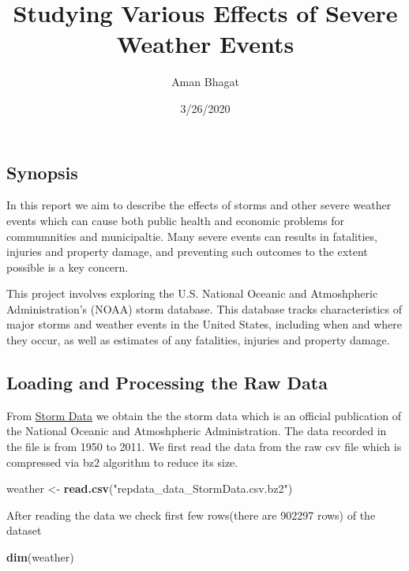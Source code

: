 \documentclass[
]{article}
\title{Studying Various Effects of Severe Weather Events}
\author{Aman Bhagat}
\date{3/26/2020}
\newenvironment{Shaded}{\begin{snugshade}}{\end{snugshade}}
\newcommand{\KeywordTok}[1]{\textcolor[rgb]{0.13,0.29,0.53}{\textbf{#1}}}
\newcommand{\NormalTok}[1]{#1}
\newcommand{\StringTok}[1]{\textcolor[rgb]{0.31,0.60,0.02}{#1}}
\begin{document}
\maketitle

\hypertarget{synopsis}{%
\subsection{Synopsis}\label{synopsis}}

In this report we aim to describe the effects of storms and other severe
weather events which can cause both public health and economic problems
for commumnities and municipaltie. Many severe events can results in
fatalities, injuries and property damage, and preventing such outcomes
to the extent possible is a key concern.

This project involves exploring the U.S. National Oceanic and
Atmoshpheric Administration's (NOAA) storm database. This database
tracks characteristics of major storms and weather events in the United
States, including when and where they occur, as well as estimates of any
fatalities, injuries and property damage.

\hypertarget{loading-and-processing-the-raw-data}{%
\subsection{Loading and Processing the Raw
Data}\label{loading-and-processing-the-raw-data}}

From
\href{https://d396qusza40orc.cloudfront.net/repdata\%2Fdata\%2FStormData.csv.bz2}{Storm
Data} we obtain the the storm data which is an official publication of
the National Oceanic and Atmoshpheric Administration. The data recorded
in the file is from 1950 to 2011. We first read the data from the raw
csv file which is compressed via bz2 algorithm to reduce its size.

\begin{Shaded}
\begin{Highlighting}[]
\NormalTok{weather <-}\StringTok{ }\KeywordTok{read.csv}\NormalTok{(}\StringTok{"repdata_data_StormData.csv.bz2"}\NormalTok{)}
\end{Highlighting}
\end{Shaded}

After reading the data we check first few rows(there are 902297 rows) of
the dataset

\begin{Shaded}
\begin{Highlighting}[]
\KeywordTok{dim}\NormalTok{(weather)}
\end{Highlighting}
\end{Shaded}
\end{document}
